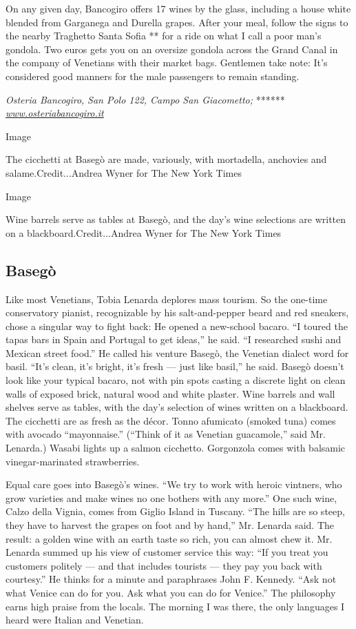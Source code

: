 On any given day, Bancogiro offers 17 wines by the glass, including a
house white blended from Garganega and Durella grapes. After your meal,
follow the signs to the nearby Traghetto Santa Sofia ** for a ride on
what I call a poor man's gondola. Two euros gets you on an oversize
gondola across the Grand Canal in the company of Venetians with their
market bags. Gentlemen take note: It's considered good manners for the
male passengers to remain standing.

\emph{Osteria Bancogiro,} \emph{San Polo 122, Campo San Giacometto;}
******
\emph{\href{http://www.osteriabancogiro.it}{www.osteriabancogiro.it}}

Image

The cicchetti at Basegò are made, variously, with mortadella, anchovies
and salame.Credit...Andrea Wyner for The New York Times

Image

Wine barrels serve as tables at Basegò, and the day's wine selections
are written on a blackboard.Credit...Andrea Wyner for The New York Times

\hypertarget{baseguxf2}{%
\subsection{Basegò}\label{baseguxf2}}

Like most Venetians, Tobia Lenarda deplores mass tourism. So the
one-time conservatory pianist, recognizable by his salt-and-pepper beard
and red sneakers, chose a singular way to fight back: He opened a
new-school bacaro. ``I toured the tapas bars in Spain and Portugal to
get ideas,'' he said. ``I researched sushi and Mexican street food.'' He
called his venture Basegò, the Venetian dialect word for basil. ``It's
clean, it's bright, it's fresh --- just like basil,'' he said. Basegò
doesn't look like your typical bacaro, not with pin spots casting a
discrete light on clean walls of exposed brick, natural wood and white
plaster. Wine barrels and wall shelves serve as tables, with the day's
selection of wines written on a blackboard. The cicchetti are as fresh
as the décor. Tonno afumicato (smoked tuna) comes with avocado
``mayonnaise.'' (``Think of it as Venetian guacamole,'' said Mr.
Lenarda.) Wasabi lights up a salmon cicchetto. Gorgonzola comes with
balsamic vinegar-marinated strawberries.

Equal care goes into Basegò's wines. ``We try to work with heroic
vintners, who grow varieties and make wines no one bothers with any
more.'' One such wine, Calzo della Vignia, comes from Giglio Island in
Tuscany. ``The hills are so steep, they have to harvest the grapes on
foot and by hand,'' Mr. Lenarda said. The result: a golden wine with an
earth taste so rich, you can almost chew it. Mr. Lenarda summed up his
view of customer service this way: ``If you treat you customers politely
--- and that includes tourists --- they pay you back with courtesy.'' He
thinks for a minute and paraphrases John F. Kennedy. ``Ask not what
Venice can do for you. Ask what you can do for Venice.'' The philosophy
earns high praise from the locals. The morning I was there, the only
languages I heard were Italian and Venetian.

